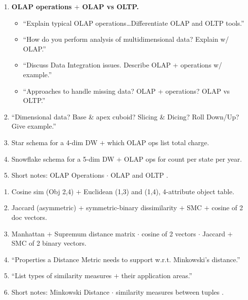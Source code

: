 \begin{enumerate}[start=12]
  \item {} \textbf{OLAP operations $+$ OLAP vs OLTP.}
  \begin{itemize}
    \item ``Explain typical OLAP operations\ldots Differentiate OLAP and OLTP tools.'' \hfill {} 
    \item ``How do you perform analysis of multidimensional data? Explain w/ OLAP.'' \hfill {} 
    \item ``Discuss Data Integration issues. Describe OLAP + operations w/ example.'' \hfill {} 
    \item ``Approaches to handle missing data? OLAP + operations? OLAP vs OLTP.'' \hfill {} 
  \end{itemize}
  \item {} ``Dimensional data? Base \& apex cuboid? Slicing \& Dicing? Roll Down/Up? Give example.'' \hfill {} 
  \item {} Star schema for a 4-dim DW $+$ which OLAP ops list total charge. \hfill {} 
  \item {} Snowflake schema for a 5-dim DW $+$ OLAP ops for count per state per year. \hfill {} 
  \item {} Short notes: OLAP Operations  $\cdot$ OLAP and OLTP . \hfill {}
\end{enumerate}

\begin{enumerate}[start=17]
  \item {} Cosine sim (Obj 2,4) $+$ Euclidean (1,3) and (1,4), 4-attribute object table. \hfill {} 
  \item {} Jaccard (asymmetric) $+$ symmetric-binary dissimilarity $+$ SMC $+$ cosine of 2 doc vectors. \hfill {} 
  \item {} Manhattan $+$ Supremum distance matrix $\cdot$ cosine of 2 vectors $\cdot$ Jaccard $+$ SMC of 2 binary vectors. \hfill {} 
  \item {} ``Properties a Distance Metric needs to support w.r.t. Minkowski's distance.'' \hfill {} 
  \item {} ``List types of similarity measures $+$ their application areas.'' \hfill {} 
  \item {} Short notes: Minkowski Distance  $\cdot$ similarity measures between tuples . \hfill {}
\end{enumerate}

